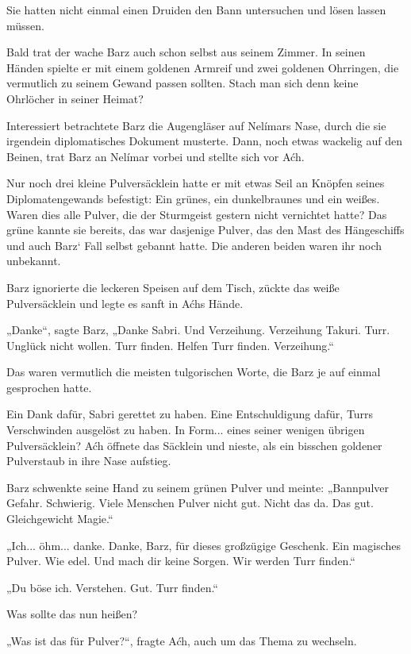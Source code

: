 Sie hatten nicht einmal einen Druiden den Bann untersuchen und lösen lassen müssen.



\trennzeichen



Bald trat der wache Barz auch schon selbst aus seinem Zimmer. In seinen Händen spielte er mit einem goldenen Armreif und zwei goldenen Ohrringen, die vermutlich zu seinem Gewand passen sollten. Stach man sich denn keine Ohrlöcher in seiner Heimat?

Interessiert betrachtete Barz die Augengläser auf Nelímars Nase, durch die sie irgendein diplomatisches Dokument musterte. Dann, noch etwas wackelig auf den Beinen, trat Barz an Nelímar vorbei und stellte sich vor Aćh.

Nur noch drei kleine Pulversäcklein hatte er mit etwas Seil an Knöpfen seines Diplomatengewands befestigt: Ein grünes, ein dunkelbraunes und ein weißes. Waren dies alle Pulver, die der Sturmgeist gestern nicht vernichtet hatte? Das grüne kannte sie bereits, das war dasjenige Pulver, das den Mast des Hängeschiffs und auch Barz‘ Fall selbst gebannt hatte. Die anderen beiden waren ihr noch unbekannt.

Barz ignorierte die leckeren Speisen auf dem Tisch, zückte das weiße Pulversäcklein und legte es sanft in Aćhs Hände.

„Danke“, sagte Barz, „Danke Sabri. Und Verzeihung. Verzeihung Takuri. Turr. Unglück nicht wollen. Turr finden. Helfen Turr finden. Verzeihung.“

Das waren vermutlich die meisten tulgorischen Worte, die Barz je auf einmal gesprochen hatte.

Ein Dank dafür, Sabri gerettet zu haben. Eine Entschuldigung dafür, Turrs Verschwinden ausgelöst zu haben. In Form... eines seiner wenigen übrigen Pulversäcklein? Aćh öffnete das Säcklein und nieste, als ein bisschen goldener Pulverstaub in ihre Nase aufstieg.

Barz schwenkte seine Hand zu seinem grünen Pulver und meinte: „Bannpulver Gefahr. Schwierig. Viele Menschen Pulver nicht gut. Nicht das da. Das gut. Gleichgewicht Magie.“

„Ich... öhm... danke. Danke, Barz, für dieses großzügige Geschenk. Ein magisches Pulver. Wie edel. Und mach dir keine Sorgen. Wir werden Turr finden.“

„Du böse ich. Verstehen. Gut. Turr finden.“

Was sollte das nun heißen?

„Was ist das für Pulver?“, fragte Aćh, auch um das Thema zu wechseln.

